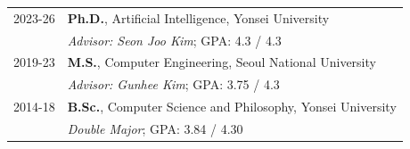 
\begin{longtable}[l]{@{}p{} p{}@{}}
    2023-26 & \textbf{Ph.D.}, Artificial Intelligence, Yonsei University \\
    & \textit{Advisor: Seon Joo Kim}; GPA: 4.3 / 4.3 \\
    2019-23 & \textbf{M.S.}, Computer Engineering, Seoul National University \\
    & \textit{Advisor: Gunhee Kim}; GPA: 3.75 / 4.3 \\
    2014-18 & \textbf{B.Sc.}, Computer Science and Philosophy, Yonsei University \\
    & \textit{Double Major}; GPA: 3.84 / 4.30 \\
\end{longtable}
